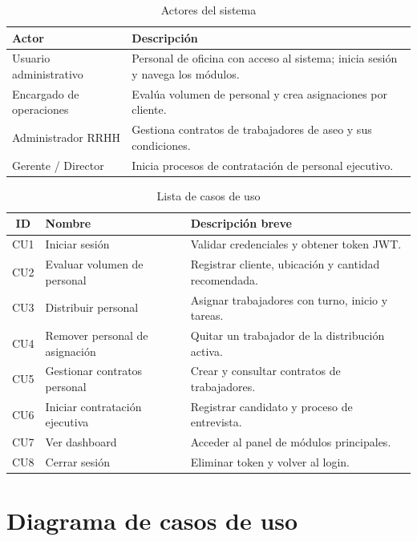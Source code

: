 \documentclass[12pt,a4paper]{report}
\begin{document}
\begin{table}[htbp]
  \centering
  \caption{Actores del sistema}
  \label{tab:actores}
  \begin{tabular}{@{}p{4cm}p{9cm}@{}}
    \toprule
    \textbf{Actor} & \textbf{Descripción} \\
    \midrule
    Usuario administrativo & Personal de oficina con acceso al sistema; inicia sesión y navega los módulos. \\
    Encargado de operaciones & Evalúa volumen de personal y crea asignaciones por cliente. \\
    Administrador RRHH & Gestiona contratos de trabajadores de aseo y sus condiciones. \\
    Gerente / Director & Inicia procesos de contratación de personal ejecutivo. \\
    \bottomrule
  \end{tabular}
\end{table}

\begin{table}[htbp]
  \centering
  \caption{Lista de casos de uso}
  \label{tab:cu}
  \begin{tabular}{@{}clp{8cm}@{}}
    \toprule
    \textbf{ID} & \textbf{Nombre} & \textbf{Descripción breve} \\
    \midrule
    CU1 & Iniciar sesión & Validar credenciales y obtener token JWT. \\
    CU2 & Evaluar volumen de personal & Registrar cliente, ubicación y cantidad recomendada. \\
    CU3 & Distribuir personal & Asignar trabajadores con turno, inicio y tareas. \\
    CU4 & Remover personal de asignación & Quitar un trabajador de la distribución activa. \\
    CU5 & Gestionar contratos personal & Crear y consultar contratos de trabajadores. \\
    CU6 & Iniciar contratación ejecutiva & Registrar candidato y proceso de entrevista. \\
    CU7 & Ver dashboard & Acceder al panel de módulos principales. \\
    CU8 & Cerrar sesión & Eliminar token y volver al login. \\
    \bottomrule
  \end{tabular}
\end{table}

\pagebreak
\section{Diagrama de casos de uso}
\end{document}
